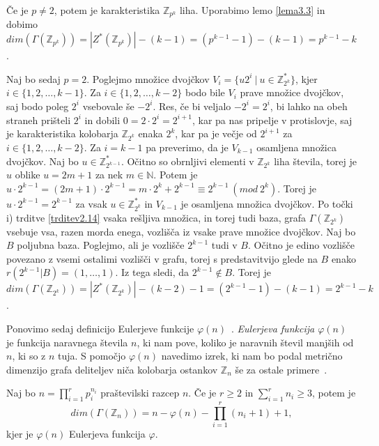 \documentclass[mat1, tisk]{fmfdelo}
\newcommand{\N}{\mathbb N}
\newcommand{\Z}{\mathbb Z}
\begin{document}
\begin{dokaz}
  Če je $p \neq 2$, potem je karakteristika $\Z_{p^k}$ liha. Uporabimo lemo \ref{lema3.3} in dobimo 
  $dim(\Gamma(\Z_{p^k})) = |Z^*(\Z_{p^k})| - (k - 1) = (p^{k-1} - 1) - (k - 1) = p^{k-1} - k$.

  Naj bo sedaj $p = 2$. Poglejmo množice dvojčkov $V_i = \{u 2^i~|~  u \in  \Z_{2^k}^{*}\}$, kjer 
  $i \in \{1, 2, \ldots, k-1\}$. Za $i \in \{1, 2, \ldots, k-2\}$ bodo bile $V_i$ prave množice dvojčkov, saj 
  bodo poleg $2^i$ vsebovale še $-2^i$. Res, če bi veljalo $-2^i = 2^i$, bi lahko na obeh straneh prišteli 
  $2^i$ in dobili $0 = 2 \cdot 2^i = 2^{i+1}$, kar pa nas pripelje v protislovje, saj je karakteristika 
  kolobarja $\Z_{2^k}$ enaka $2^k$, kar pa je večje od $2^{i+1}$ za $i \in \{1, 2, \ldots, k-2\}$.
  Za $i = k-1$ pa preverimo, da je $V_{k-1}$ osamljena množica dvojčkov. Naj bo $u \in \Z_{2^{k-1}}^{*}$. 
  Očitno so obrnljivi elementi v $\Z_{2^{k}}$ liha števila, torej je $u$ oblike $u = 2m + 1$ za nek 
  $m \in \N$. Potem je $u \cdot 2^{k-1} = (2m + 1) \cdot 2^{k-1} = m \cdot 2^{k} + 2^{k-1} \equiv 2^{k-1} ~(mod~2^{k})$. 
  Torej je $u \cdot 2^{k-1} = 2^{k-1}$ za vsak $u \in \Z_{2^{k}}^{*}$ in $V_{k-1}$ je osamljena 
  množica dvojčkov. Po točki i) 
  trditve \ref{trditev2.14} vsaka rešljiva množica, in torej tudi baza, grafa $\Gamma(\Z_{2^k})$ 
  vsebuje vsa, razen morda enega, vozlišča iz vsake prave množice dvojčkov. Naj bo 
  $B$ poljubna baza. Poglejmo, ali je vozlišče $2^{k-1}$ tudi v $B$. Očitno je edino vozlišče povezano z 
  vsemi ostalimi vozlišči v grafu, torej s predstavitvijo glede na $B$ enako 
  $r(2^{k-1}|B) = (1, \ldots, 1)$. Iz tega sledi, da $2^{k-1} \notin B$. Torej je 
  $dim(\Gamma(\Z_{2^{k}})) = |Z^*(\Z_{2^k})| - (k - 2) - 1 = (2^{k-1} - 1) - (k - 1) = 2^{k-1} - k$.
\end{dokaz}
%
Ponovimo sedaj definicijo Eulerjeve funkcije $\varphi(n)$~\cite{wiki:xxx}. \emph{Eulerjeva funkcija $\varphi (n)$} 
je funkcija naravnega števila $n$, ki nam pove, koliko je naravnih števil manjših od $n$, ki so z $n$ tuja. 
S pomočjo $\varphi(n)$ navedimo izrek, ki nam bo podal metrično dimenzijo grafa deliteljev niča 
kolobarja ostankov $\Z_{n}$ še za ostale primere~\cite{0OuSh}.
%
\begin{izrek}
  Naj bo $n = \prod\limits_{i = 1}^{r}p_i^{n_i}$ praštevilski razcep $n$. Če je $r \geq 2$ in 
  $\sum\limits_{i=1}^{r}n_i \geq 3$, potem je 
  \begin{equation*}
      dim(\Gamma(\Z_{n})) = n - \varphi(n) - \prod_{i = 1}^{r}(n_i + 1) + 1,
  \end{equation*}
  kjer je $\varphi(n)$ Eulerjeva funkcija $\varphi$.
\end{izrek}
\end{document}
